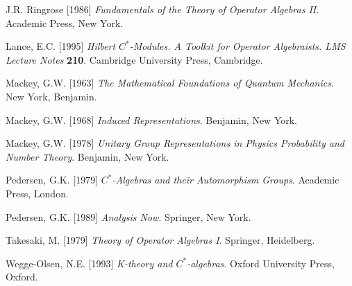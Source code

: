 J.R. Ringrose [1986] {\em Fundamentals of the Theory of Operator
Algebras II}.  Academic Press, New York.\item Lance, E.C. [1995] {\em
Hilbert $C^*$-Modules. A Toolkit for Operator Algebraists. LMS Lecture
Notes} {\bf 210}.  Cambridge University Press, Cambridge.\item Mackey,
G.W. [1963] {\em The Mathematical Foundations of Quantum
Mechanics}. New York, Benjamin.
\item 
Mackey, G.W. [1968] {\em Induced Representations}. Benjamin, New York.\item 
Mackey, G.W. [1978]  {\em Unitary Group Representations in Physics Probability and
Number Theory}. Benjamin, New York.\item 
Pedersen, G.K. [1979] {\em $C^*$-Algebras and their Automorphism Groups}. Academic Press,
London.\item 
Pedersen, G.K. [1989] {\em Analysis Now}. Springer, New York.\item
Takesaki, M. [1979] {\em Theory of Operator Algebras I}. Springer, Heidelberg.
\item  Wegge-Olsen, N.E. [1993] {\em  K-theory and $C^*$-algebras}.
 Oxford University Press, Oxford.
\endgroup






